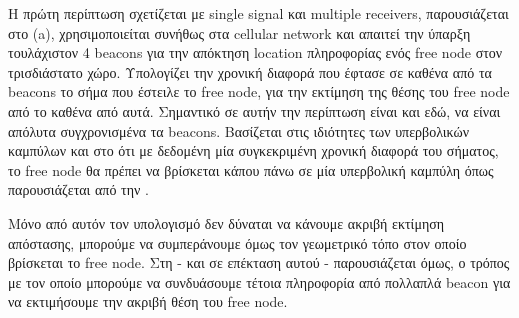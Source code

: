 Η πρώτη περίπτωση σχετίζεται με single signal και multiple receivers, παρουσιάζεται στο 
 (a), 
χρησιμοποιείται συνήθως στα cellular network και απαιτεί την ύπαρξη 
τουλάχιστον 4 beacons για την απόκτηση location πληροφορίας ενός free node στον τρισδιάστατο χώρο. Υπολογίζει την χρονική διαφορά
που έφτασε σε καθένα από τα beacons το σήμα που έστειλε το free node, για την εκτίμηση της θέσης του free node από
το καθένα από αυτά. Σημαντικό σε αυτήν την περίπτωση είναι και εδώ, να είναι απόλυτα συγχρονισμένα τα beacons. 
Βασίζεται στις ιδιότητες των υπερβολικών καμπύλων και στο ότι με δεδομένη μία συγκεκριμένη χρονική διαφορά του σήματος, 
το free node θα πρέπει να βρίσκεται κάπου πάνω σε μία υπερβολική καμπύλη όπως παρουσιάζεται από την 
\cite{youtube-angle-of-arrival-tdoa-hyberbolas}. 

Μόνο από αυτόν τον υπολογισμό δεν δύναται να κάνουμε ακριβή εκτίμηση από\-στασης, 
μπορούμε να συμπεράνουμε όμως τον γεωμετρικό τόπο στον οποίο βρίσκεται το free node. Στη  - και σε επέκταση αυτού -
παρουσιάζεται όμως, ο τρόπος με τον οποίο μπορούμε να συνδυάσουμε τέτοια πληροφορία από πολλαπλά beacon για να εκτιμήσουμε την ακριβή θέση του free node.

